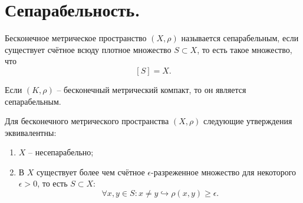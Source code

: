 \section{Сепарабельность.}
\begin{definition}
    Бесконечное метрическое пространство $(X, \rho)$ называется сепарабельным, если существует счётное всюду плотное множество $S \subset X$, то есть такое множество, что
    \[
        [S] = X.
    \]
\end{definition}
\begin{example}
    Если $(K, \rho)$ -- бесконечный метрический компакт, то он является сепарабельным.
\end{example}
\begin{proposition}
    Для бесконечного метрического пространства $(X, \rho)$ следующие утверждения эквивалентны:
    \begin{enumerate}
        \item $X$ -- несепарабельно;
        \item В $X$ существует более чем счётное $\epsilon$-разреженное множество для некоторого $\epsilon > 0$, то есть $S \subset X\colon$
        \[
            \forall x, y \in S\colon x \neq y \hookrightarrow \rho(x, y) \geq \epsilon.
        \]
    \end{enumerate}
\end{proposition}
